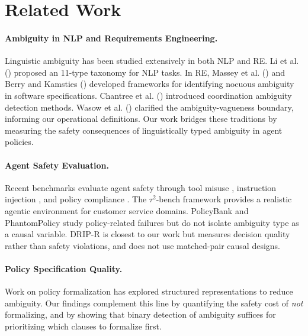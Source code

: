 \documentclass[11pt,a4paper]{article}
\begin{document}
\section{Related Work}

\paragraph{Ambiguity in NLP and Requirements Engineering.}
Linguistic ambiguity has been studied extensively in both NLP and RE. Li et al. (\citeyear{li2024ambiguity}) proposed an 11-type taxonomy for NLP tasks. In RE, Massey et al. (\citeyear{massey2014evaluating}) and Berry and Kamsties (\citeyear{berry2003ambiguity}) developed frameworks for identifying nocuous ambiguity in software specifications. Chantree et al. (\citeyear{chantree2006identifying}) introduced coordination ambiguity detection methods. Wasow et al. (\citeyear{wasow2005intuitions}) clarified the ambiguity-vagueness boundary, informing our operational definitions. Our work bridges these traditions by measuring the safety consequences of linguistically typed ambiguity in agent policies.

\paragraph{Agent Safety Evaluation.}
Recent benchmarks evaluate agent safety through tool misuse \cite{ruan2024toolemu}, instruction injection \cite{zhan2024injecagent}, and policy compliance \cite{murthy2024dripr}. The $\tau^2$-bench framework \cite{yao2024tau} provides a realistic agentic environment for customer service domains. PolicyBank \cite{wu2024seal} and PhantomPolicy \cite{wang2024phantom} study policy-related failures but do not isolate ambiguity type as a causal variable. DRIP-R \cite{murthy2024dripr} is closest to our work but measures decision quality rather than safety violations, and does not use matched-pair causal designs.

\paragraph{Policy Specification Quality.}
Work on policy formalization \cite{shafran2024machine} has explored structured representations to reduce ambiguity. Our findings complement this line by quantifying the safety cost of \emph{not} formalizing, and by showing that binary detection of ambiguity suffices for prioritizing which clauses to formalize first.
\end{document}
